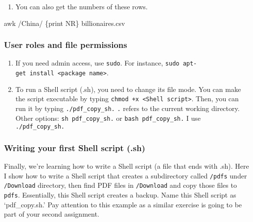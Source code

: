 \documentclass[
]{book}
\newenvironment{Shaded}{\begin{snugshade}}{\end{snugshade}}
\newcommand{\FunctionTok}[1]{\textcolor[rgb]{0.00,0.00,0.00}{#1}}
\newcommand{\NormalTok}[1]{#1}
\newcommand{\StringTok}[1]{\textcolor[rgb]{0.31,0.60,0.02}{#1}}
\providecommand{\tightlist}{%
  \setlength{\itemsep}{0pt}\setlength{\parskip}{0pt}}
\begin{document}
\begin{enumerate}
\def\labelenumi{\arabic{enumi}.}
\setcounter{enumi}{3}
\tightlist
\item
  You can also get the numbers of these rows.
\end{enumerate}

\begin{Shaded}
\begin{Highlighting}[]
\FunctionTok{awk} \StringTok{\textquotesingle{}/China/ \{print NR\}\textquotesingle{}}\NormalTok{ billionaires.csv }
\end{Highlighting}
\end{Shaded}

\hypertarget{user-roles-and-file-permissions}{%
\subsubsection{User roles and file permissions}\label{user-roles-and-file-permissions}}

\begin{enumerate}
\def\labelenumi{\arabic{enumi}.}
\item
  If you need admin access, use \texttt{sudo}. For instance, \texttt{sudo\ apt-get\ install\ \textless{}package\ name\textgreater{}}.
\item
  To run a Shell script (.sh), you need to change its file mode. You can make the script executable by typing \texttt{chmod\ +x\ \textless{}Shell\ script\textgreater{}}. Then, you can run it by typing \texttt{./pdf\_copy\_sh.} \texttt{.} refers to the current working directory. Other options: \texttt{sh\ pdf\_copy\_sh.} or \texttt{bash\ pdf\_copy\_sh.} I use \texttt{./pdf\_copy\_sh.}
\end{enumerate}

\hypertarget{writing-your-first-shell-script-.sh}{%
\subsubsection{Writing your first Shell script (.sh)}\label{writing-your-first-shell-script-.sh}}

Finally, we're learning how to write a Shell script (a file that ends with .sh). Here I show how to write a Shell script that creates a subdirectory called \texttt{/pdfs} under \texttt{/Download} directory, then find PDF files in \texttt{/Download} and copy those files to \texttt{pdfs}. Essentially, this Shell script creates a backup. Name this Shell script as `pdf\_copy.sh.' Pay attention to this example as a similar exercise is going to be part of your second assignment.
\end{document}
